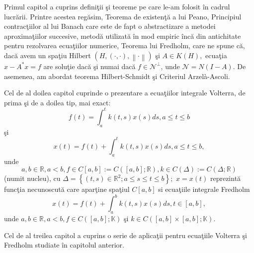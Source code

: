\documentclass[a4paper,12pt,oneside]{report}
\begin{document}
Primul capitol a cuprins defini\c{t}ii \c{s}i teoreme pe care  le-am folosit \^{i}n cadrul lucr\u{a}rii. Printre acestea reg\u{a}sim, Teorema de existen\c{t}\u{a} a lui Peano, Principiul contrac\c{t}iilor al lui Banach care este de fapt o abstractizare a metodei aproxima\c{t}iilor succesive, metod\u{a} utilizat\u{a} \^{i}n mod empiric \^{i}nc\u{a} din antichitate pentru rezolvarea ecua\c{t}iilor numerice, Teorema lui Fredholm, care ne spune c\u{a}, dac\u{a} avem un spa\c{t}iu Hilbert \(\left ( H, \left ( \cdot ,\cdot  \right ), \left \| \cdot  \right \| \right )\)  \c{s}i  \(A \in K\left ( H \right ),\) ecua\c{t}ia \(x - A^{\ast }x = f\) are solu\c{t}ie dac\u{a} \c{s}i numai dac\u{a} \(f \in { \mathcal{N}} ^{\perp }\), unde \({ \mathcal{N}} = N\left ( I - A \right ).\)  De asemenea, am abordat teorema Hilbert-Schmidt \c{s}i Criteriul Arzelà-Ascoli.

Cel de al doilea capitol cuprinde o prezentare a ecua\c{t}iilor integrale  Volterra, de prima \c{s}i de a doilea tip, mai exact:
\begin{displaymath}
f\left ( t \right ) = \int_{a}^{t}k\left ( t,s \right )x\left ( s \right )ds,    a\leq t\leq b
\end{displaymath}
\c{s}i
\begin{displaymath}
x\left ( t \right ) = f\left ( t \right ) + \int_{a}^{t}k\left ( t,s \right )x\left ( s \right )ds, a\leq t\leq b,
\end{displaymath}
unde \[a,b \in \mathbb{R}, a< b, f\in C\left [ a,b \right ]:= C\left ( \left [ a,b \right ];\mathbb{R} \right ), k\in C\left (\Delta   \right ):= C\left ( \Delta ;\mathbb{R} \right )\] (numit nucleu), cu \(\Delta =\left \{ \left ( t,s \right )\in \mathbb{R}^{2};a\leq s\leq t\leq b \right \};\) \(x=x\left ( t \right )\) reprezint\u{a} func\c{t}ia necunoscut\u{a} care apar\c{t}ine spa\c{t}iul \(C\left [ a,b \right ]\)
si ecua\c{t}iile integrale  Fredholm
\begin{displaymath}
x\left ( t \right ) = f\left ( t \right ) + \int_{a}^{b}k\left ( t,s \right )x\left ( s \right )ds, t\in \left [ a,b \right ],
\end{displaymath}
unde \(a,b \in \mathbb{R}, a< b, f\in C\left ( \left [ a,b \right ]; \mathbb{K}\right )\) \c{s}i \(k\in C\left ( \left [ a,b \right ] \times \left [ a,b \right ]; \mathbb{K}\right ).\)

Cel de al treilea capitol  a cuprins o serie de aplica\c{t}ii  pentru ecua\c{t}iile Volterra \c{s}i Fredholm studiate \^{i}n capitolul anterior.



\setlength{\baselineskip}{\normalbaselineskip}
\setlength{\parskip}{0pt}

\end{document}
